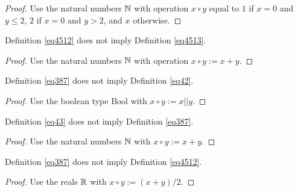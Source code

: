 \begin{proof}\leanok Use the natural numbers $\mathbb{N}$ with operation $x \circ y$ equal to $1$ if $x=0$ and $y \leq 2$, $2$ if $x=0$ and $y>2$, and $x$ otherwise.
\end{proof}

\begin{theorem}\label{4512_not_imply_4513}\leanok{} Definition \ref{eq4512} does not imply Definition \ref{eq4513}.
\end{theorem}

\begin{proof}\leanok Use the natural numbers $\mathbb{N}$ with operation $x \circ y := x + y$.
\end{proof}

\begin{theorem}\label{387_not_imply_42}\leanok{} Definition \ref{eq387} does not imply Definition \ref{eq42}.
\end{theorem}

\begin{proof}\leanok Use the boolean type $\mathrm{Bool}$ with $x \circ y := x || y$.
\end{proof}

\begin{theorem}\label{43_not_imply_387}\leanok{} Definition \ref{eq43} does not imply Definition \ref{eq387}.
\end{theorem}

\begin{proof}\leanok Use the natural numbers $\mathbb{N}$ with $x \circ y := x+y$.
\end{proof}

\begin{theorem}\label{387_not_imply_4512}\leanok{} Definition \ref{eq387} does not imply Definition \ref{eq4512}.
\end{theorem}

\begin{proof}\leanok Use the reals $\mathbb{R}$ with $x \circ y := (x+y)/2$.
\end{proof}
